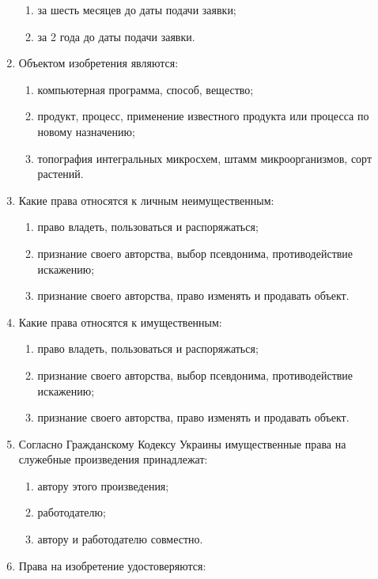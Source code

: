 \begin{enumerate}
\begin{enumerate}
        \item за шесть месяцев до даты подачи заявки;
        \item за 2 года до даты подачи заявки.
    \end{enumerate}
    \item Объектом изобретения являются:
    \begin{enumerate}
        \item компьютерная программа, способ, вещество;
        \item \cmark продукт, процесс, применение известного продукта или процесса по новому назначению;
        \item топография интегральных микросхем, штамм микроорганизмов, сорт растений.
    \end{enumerate}
    \item Какие права относятся к личным неимущественным:
    \begin{enumerate}
        \item право владеть, пользоваться и распоряжаться;
        \item признание своего авторства, выбор псевдонима, противодействие искажению;
        \item \cmark признание своего авторства, право изменять и продавать объект.
    \end{enumerate}
    \item Какие права относятся к имущественным:
    \begin{enumerate}
        \item \cmark право владеть, пользоваться и распоряжаться;
        \item признание своего авторства, выбор псевдонима, противодействие искажению;
        \item признание своего авторства, право изменять и продавать объект.
    \end{enumerate}
    \item Согласно Гражданскому Кодексу Украины имущественные права на служебные произведения принадлежат:
    \begin{enumerate}
        \item автору этого произведения;
        \item работодателю;
        \item \cmark автору и работодателю совместно.
    \end{enumerate}
    \item Права на изобретение удостоверяются:
    \begin{enumerate}

\end{enumerate}
\end{enumerate}
